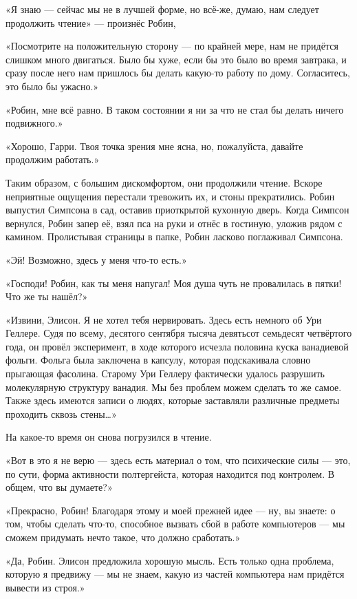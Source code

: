 \documentclass[a5paper, 9pt,
final, openany, twoside=true]{memoir}
\begin{document}
«Я знаю — сейчас мы не в лучшей форме, но всё-же, думаю, нам следует продолжить чтение» — произнёс Робин,

«Посмотрите на положительную сторону — по крайней мере, нам не придётся слишком много двигаться. Было бы хуже, если бы это было во время завтрака, и сразу после него нам пришлось бы делать какую-то работу по дому. Согласитесь, это было бы ужасно.»

«Робин, мне всё равно. В таком состоянии я ни за что не стал бы делать ничего подвижного.»

«Хорошо, Гарри. Твоя точка зрения мне ясна, но, пожалуйста, давайте продолжим работать.»\bigskip

Таким образом, с большим дискомфортом, они продолжили чтение. Вскоре неприятные ощущения перестали тревожить их, и стоны прекратились. Робин выпустил Симпсона в сад, оставив приоткрытой кухонную дверь. Когда Симпсон вернулся, Робин запер её, взял пса на руки и отнёс в гостиную, уложив рядом с камином. Пролистывая страницы в папке, Робин ласково поглаживал Симпсона.

«Эй! Возможно, здесь у меня что-то есть.»

«Господи! Робин, как ты меня напугал! Моя душа чуть не провалилась в пятки! Что же ты нашёл?»

«Извини, Элисон. Я не хотел тебя нервировать. Здесь есть немного об Ури Геллере. Судя по всему, десятого сентября тысяча девятьсот семьдесят четвёртого года, он провёл эксперимент, в ходе которого исчезла половина куска ванадиевой фольги. Фольга была заключена в капсулу, которая подскакивала словно прыгающая фасолина. Старому Ури Геллеру фактически удалось разрушить молекулярную структуру ванадия. Мы без проблем можем сделать то же самое. Также здесь имеются записи о людях, которые заставляли различные предметы проходить сквозь стены…»

На какое-то время он снова погрузился в чтение.

«Вот в это я не верю — здесь есть материал о том, что психические силы — это, по сути, форма активности полтергейста, которая находится под контролем. В общем, что вы думаете?»

«Прекрасно, Робин! Благодаря этому и моей прежней идее — ну, вы знаете: о том, чтобы сделать что-то, способное вызвать сбой в работе компьютеров — мы сможем придумать нечто такое, что должно сработать.»

«Да, Робин. Элисон предложила хорошую мысль. Есть только одна проблема, которую я предвижу — мы не знаем, какую из частей компьютера нам придётся вывести из строя.»
\end{document}
